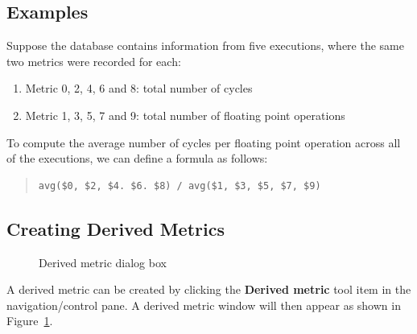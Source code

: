 \subsection{Examples}

Suppose the database contains information from five executions, where the same two metrics were recorded for each:
\begin{enumerate}
\item Metric 0, 2, 4, 6 and 8: total number of cycles
\item Metric 1, 3, 5, 7 and 9: total number of floating point operations
\end{enumerate}
To compute the average number of cycles per floating point operation across all of the executions, we can define a formula as follows:
\begin{quote}
\begin{verbatim}
avg($0, $2, $4. $6. $8) / avg($1, $3, $5, $7, $9)
\end{verbatim}
\end{quote}


\subsection{Creating Derived Metrics}

\begin{figure}[t]
\caption{Derived metric dialog box}
\label{fig:hpcviewer-derived-dialog-box}
\end{figure}

A derived metric can be created by clicking the \textbf{Derived metric} tool item in the navigation/control pane.
A derived metric window will then appear as shown in Figure~\ref{fig:hpcviewer-derived-dialog-box}.


